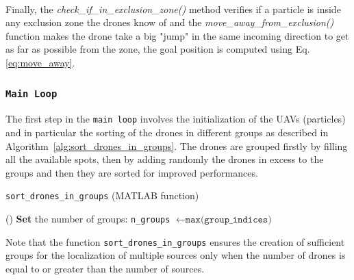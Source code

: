 \documentclass[main]{subfiles}
\begin{document}
\noindent\\
Finally, the
\textit{check\_if\_in\_exclusion\_zone()} 
method verifies if a particle is inside any 
exclusion zone the drones know of and  
the \textit{move\_away\_from\_exclusion()} function
makes the drone take a big "jump" in the same incoming direction
to get as far as possible from the zone, the goal 
position is computed using Eq.\ref{eq:move_away}.

\subsubsection{\texttt{Main Loop}}
The first step in the \texttt{main loop} involves the initialization
of the UAVs (particles) and in particular the sorting of 
the drones in different groups as described in Algorithm~\ref{alg:sort_drones_in_groups}.
The drones are grouped firstly by filling 
all the available spots, then by adding randomly the drones in excess
to the groups and then they are sorted for improved performances.

\begin{algorithm}
    \caption{\texttt{sort\_drones\_in\_groups} (MATLAB function)}\label{alg:sort_drones_in_groups}
    \vspace{0.3\baselineskip}
    \nonl \Fn(\tcc*[h]{}){}{
    \SetAlgoBlockMarkers{}{}
    \textbf{Set} the number of groups: \texttt{n\_groups} $\gets \texttt{max(group\_indices)}$\;
 }
\end{algorithm}

\noindent Note that the function \texttt{sort\_drones\_in\_groups} ensures the creation of sufficient groups 
for the localization of multiple sources only when the number of drones is equal to or greater than 
the number of sources.
\end{document}
